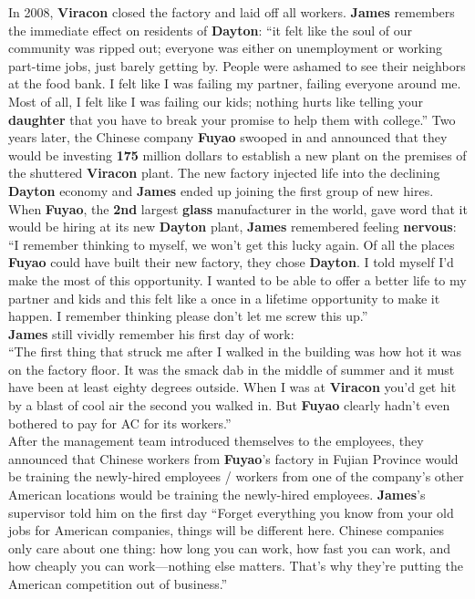 \documentclass[12pt]{article}
\begin{document}
In 2008, \textbf{Viracon} closed the factory and laid off all workers.  \textbf{James} remembers the immediate effect on residents of \textbf{Dayton}: ``it felt like the soul of our community was ripped out; everyone was either on unemployment or working part-time jobs, just barely getting by. People were ashamed to see their neighbors at the food bank. I felt like I was failing my partner, failing everyone around me. Most of all, I felt like I was failing our kids; nothing hurts like telling your \textbf{daughter} that you have to break your promise to help them with college.'' Two years later, the Chinese company \textbf{Fuyao} swooped in and announced that they would be investing \textbf{175} million dollars to establish a new plant on the premises of the shuttered \textbf{Viracon} plant. The new factory injected life into the declining \textbf{Dayton} economy and \textbf{James} ended up joining the first group of new hires.\\

When \textbf{Fuyao}, the \textbf{2nd} largest \textbf{glass} manufacturer in the world, gave word that it would be hiring at its new \textbf{Dayton} plant, \textbf{James} remembered feeling \textbf{nervous}: ``I remember thinking to myself, we won't get this lucky again. Of all the places \textbf{Fuyao} could have built their new factory, they chose \textbf{Dayton}. I told myself I'd make the most of this opportunity. I wanted to be able to offer a better life to my partner and kids and this felt like a once in a lifetime opportunity to make it happen. I remember thinking please don't let me screw this up.''\\

\textbf{James} still vividly remember his first day of work:\\


 ``The first thing that struck me after I walked in the building was how hot it was on the factory floor. It was the smack dab in the middle of summer and it must have been at least eighty degrees outside. When I was at \textbf{Viracon} you'd get hit by a blast of cool air the second you walked in. But \textbf{Fuyao} clearly hadn't even bothered to pay for AC for its workers.''\\

After the management team introduced themselves to the employees, they announced that Chinese workers from \textbf{Fuyao}'s factory in Fujian Province would be training the newly-hired employees / workers from one of the company's other American locations would be training the newly-hired employees. \textbf{James}'s supervisor told him on the first day ``Forget everything you know from your old jobs for American companies, things will be different here. Chinese companies only care about one thing: how long you can work, how fast you can work, and how cheaply you can work---nothing else matters. That's why they're putting the American competition out of business.''\\
\end{document}
